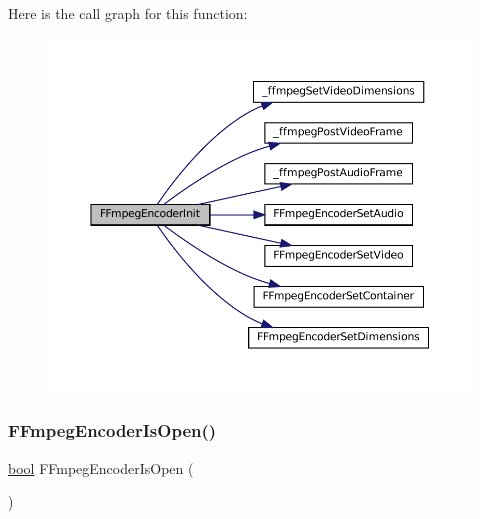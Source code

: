Here is the call graph for this function\+:
\nopagebreak
\begin{figure}[H]
\begin{center}
\leavevmode
\includegraphics[width=350pt]{ffmpeg-encoder_8h_a0204b8f313804cbd68f07e609b39a76b_cgraph}
\end{center}
\end{figure}
\mbox{\label{ffmpeg-encoder_8h_a4a0cb59ff73f22b4a90443c8ad1aebb8}} 
\subsubsection{\texorpdfstring{F\+Fmpeg\+Encoder\+Is\+Open()}{FFmpegEncoderIsOpen()}}
{\footnotesize\ttfamily \mbox{\hyperlink{libretro_8h_a4a26dcae73fb7e1528214a068aca317e}{bool}} F\+Fmpeg\+Encoder\+Is\+Open (\begin{DoxyParamCaption}\item[{struct \mbox{\hyperlink{ffmpeg-encoder_8h_struct_f_fmpeg_encoder}{F\+Fmpeg\+Encoder}} $\ast$}]{ }\end{DoxyParamCaption})}

\mbox{\label{ffmpeg-encoder_8h_a0299d242cf2dc28fcf17994c46b72faf}} 
